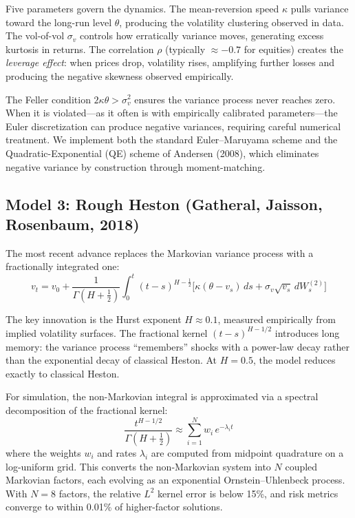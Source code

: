 \documentclass[11pt,a4paper]{article}
\begin{document}
Five parameters govern the dynamics. The mean-reversion speed $\kappa$ pulls variance toward the long-run level $\theta$, producing the volatility clustering observed in data. The vol-of-vol $\sigma_v$ controls how erratically variance moves, generating excess kurtosis in returns. The correlation $\rho$ (typically $\approx -0.7$ for equities) creates the \emph{leverage effect}: when prices drop, volatility rises, amplifying further losses and producing the negative skewness observed empirically.

The Feller condition $2\kappa\theta > \sigma_v^2$ ensures the variance process never reaches zero. When it is violated---as it often is with empirically calibrated parameters---the Euler discretization can produce negative variances, requiring careful numerical treatment. We implement both the standard Euler--Maruyama scheme and the Quadratic-Exponential (QE) scheme of Andersen (2008), which eliminates negative variance by construction through moment-matching.

\subsection{Model 3: Rough Heston (Gatheral, Jaisson, Rosenbaum, 2018)}

The most recent advance replaces the Markovian variance process with a fractionally integrated one:
\begin{equation}
v_t = v_0 + \frac{1}{\Gamma(H + \tfrac{1}{2})} \int_0^t (t-s)^{H - \frac{1}{2}} \Big[ \kappa(\theta - v_s)\, ds + \sigma_v \sqrt{v_s}\, dW_s^{(2)} \Big]
\end{equation}

The key innovation is the Hurst exponent $H \approx 0.1$, measured empirically from implied volatility surfaces. The fractional kernel $(t-s)^{H - 1/2}$ introduces long memory: the variance process ``remembers'' shocks with a power-law decay rather than the exponential decay of classical Heston. At $H = 0.5$, the model reduces exactly to classical Heston.

For simulation, the non-Markovian integral is approximated via a spectral decomposition of the fractional kernel:
\begin{equation}
\frac{t^{H - 1/2}}{\Gamma(H + \tfrac{1}{2})} \approx \sum_{i=1}^{N} w_i \, e^{-\lambda_i t}
\end{equation}
where the weights $w_i$ and rates $\lambda_i$ are computed from midpoint quadrature on a log-uniform grid. This converts the non-Markovian system into $N$ coupled Markovian factors, each evolving as an exponential Ornstein--Uhlenbeck process. With $N = 8$ factors, the relative $L^2$ kernel error is below 15\%, and risk metrics converge to within 0.01\% of higher-factor solutions.
\end{document}
